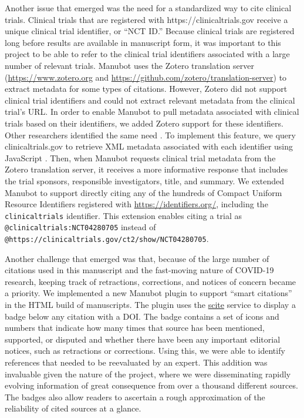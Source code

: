 \documentclass[sigconf]{acmart}
\begin{document}
Another issue that emerged was the need for a standardized way to cite clinical trials.
Clinical trials that are registered with https://clinicaltrials.gov receive a unique clinical trial identifier, or ``NCT ID.''
Because clinical trials are registered long before results are available in manuscript form, it was important to this project to be able to refer to the clinical trial identifiers associated with a large number of relevant trials.
Manubot uses the Zotero translation server (\url{https://www.zotero.org} and \url{https://github.com/zotero/translation-server}) to extract metadata for some types of citations.
However, Zotero did not support clinical trial identifiers and could not extract relevant metadata from the clinical trial's URL.
In order to enable Manubot to pull metadata associated with clinical trials based on their identifiers, we added Zotero support for these identifiers.
Other researchers identified the same need \citep{ZQPtEdnO, thdq2nGf}.
To implement this feature, we query clinicaltrials.gov to retrieve XML metadata associated with each identifier using JavaScript \citep{Bxfd7L4s}.
Then, when Manubot requests clinical trial metadata from the Zotero translation server, it receives a more informative response that includes the trial sponsors, responsible investigators, title, and summary.
We extended Manubot to support directly citing any of the hundreds of Compact Uniform Resource Identifiers registered with \url{https://identifiers.org/}, including the \texttt{clinicaltrials} identifier.
This extension enables citing a trial as \texttt{@clinicaltrials:NCT04280705} instead of \texttt{@https://clinicaltrials.gov/ct2/show/NCT04280705}.

Another challenge that emerged was that, because of the large number of citations used in this manuscript and the fast-moving nature of COVID-19 research, keeping track of retractions, corrections, and notices of concern became a priority.
We implemented a new Manubot plugin to support ``smart citations'' in the HTML build of manuscripts.
The plugin uses the \href{https://scite.ai/}{scite} \citep{14UJbLWf4} service to display a badge below any citation with a DOI.
The badge contains a set of icons and numbers that indicate how many times that source has been mentioned, supported, or disputed and whether there have been any important editorial notices, such as retractions or corrections.
Using this, we were able to identify references that needed to be reevaluated by an expert.
This addition was invaluable given the nature of the project, where we were disseminating rapidly evolving information of great consequence from over a thousand different sources.
The badges also allow readers to ascertain a rough approximation of the reliability of cited sources at a glance.
\end{document}
